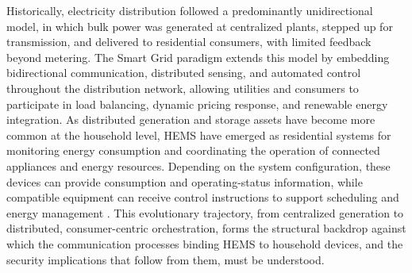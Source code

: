 Historically, electricity distribution followed a predominantly unidirectional model, in which bulk power was generated at centralized plants, stepped up for transmission, and delivered to residential consumers, with limited feedback beyond metering. The Smart Grid paradigm extends this model by embedding bidirectional communication, distributed sensing, and automated control throughout the distribution network, allowing utilities and consumers to participate in load balancing, dynamic pricing response, and renewable energy integration. As distributed generation and storage assets have become more common at the household level, HEMS have emerged as residential systems for monitoring energy consumption and coordinating the operation of connected appliances and energy resources. Depending on the system configuration, these devices can provide consumption and operating-status information, while compatible equipment can receive control instructions to support scheduling and energy management \citep{hanHomeEnergyManagement2023,shareefReviewHomeEnergy2018,sangumpaiDevelopmentRealTimeInterworking2017}. This evolutionary trajectory, from centralized generation to distributed, consumer-centric orchestration, forms the structural backdrop against which the communication processes binding HEMS to household devices, and the security implications that follow from them, must be understood.

